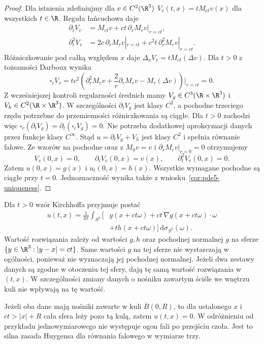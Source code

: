 \begin{proof}
Dla istnienia zdefiniujmy dla $v\in C^2(\R^3)$
$V_v(t,x)=tM_{ct}v(x)$ dla wszystkich $t\in\R$.
Reguła łańcuchowa daje
\[
 \begin{aligned}
 \partial_t V_v&=M_{ct}v+ct\,\partial_rM_rv|_{r=ct},\\
 \partial_t^2 V_v&=2c\,\partial_rM_rv|_{r=ct}
                +c^2t\,\partial_r^2M_rv|_{r=ct}.
 \end{aligned}
\]
Różniczkowanie pod całką względem $x$ daje
$\Delta_xV_v=tM_{ct}(\Delta v)$.
Dla $t>0$ z tożsamości Darboux wynika
\[
 \square_cV_v
 =tc^2\left(\partial_r^2M_rv+\frac2r\partial_rM_rv
              -M_r(\Delta v)\right)\bigg|_{r=ct}=0.
\]
Z wcześniejszej kontroli regularności średnich
mamy $V_g\in C^3(\R\times\R^3)$ i
$V_h\in C^2(\R\times\R^3)$.
W szczególności $\partial_tV_g$ jest klasy $C^2$,
a pochodne trzeciego rzędu potrzebne do
przemienności różniczkowania są ciągłe.
Dla $t>0$ zachodzi więc
$\square_c(\partial_tV_g)=\partial_t(\square_cV_g)=0$.
Nie potrzeba dodatkowej aproksymacji danych
przez funkcje klasy $C^\infty$.
Stąd $u=\partial_tV_g+V_h$ jest klasy $C^2$
i spełnia równanie falowe.
Ze wzorów na pochodne oraz z $M_0v=v$ i
$\partial_rM_rv|_{r=0}=0$ otrzymujemy
\[
 V_v(0,x)=0,\qquad
 \partial_tV_v(0,x)=v(x),\qquad
 \partial_t^2V_v(0,x)=0.
\]
Zatem $u(0,x)=g(x)$ i $u_t(0,x)=h(x)$.
Wszystkie wymagane pochodne są ciągłe przy $t=0$.
Jednoznaczność wynika także z
wniosku~\ref{cor:pde5-uniqueness}.
\end{proof}

\begin{uwaga}
Dla $t>0$ wzór Kirchhoffa przyjmuje postać
\[
 \begin{aligned}
 u(t,x)=\frac1{4\pi}\int_{S^2}
 \bigl[&g(x+ct\omega)+ct\,\nabla g(x+ct\omega)\cdot\omega\\
       &+t h(x+ct\omega)\bigr]\,\mathrm d\sigma_{S^2}(\omega).
 \end{aligned}
\]
Wartość rozwiązania zależy od wartości $g,h$
oraz pochodnej normalnej $g$ na sferze
$\{y\in\R^3:|y-x|=ct\}$.
Same wartości $g$ na tej sferze nie wystarczają
w ogólności, ponieważ nie wyznaczają jej pochodnej
normalnej. Jeżeli dwa zestawy danych są zgodne
w otoczeniu tej sfery, dają tę samą wartość
rozwiązania w $(t,x)$. W szczególności zmiany
danych o nośniku zawartym ściśle we wnętrzu
kuli nie wpływają na tę wartość.

Jeżeli oba dane mają nośniki zawarte w kuli
$\overline B(0,R)$, to dla ustalonego $x$
i $ct>|x|+R$ cała sfera leży poza tą kulą,
zatem $u(t,x)=0$. W odróżnieniu od przykładu
jednowymiarowego nie występuje ogon fali po
przejściu czoła. Jest to silna zasada Huygensa
dla równania falowego w wymiarze trzy.
\end{uwaga}

